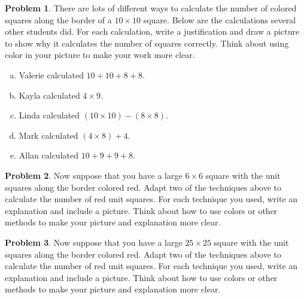 \documentclass[12pt, reqno]{amsart}
\theoremstyle{remark}
\theoremstyle{definition}
\newtheorem{problem}{Problem}
\numberwithin{equation}{section}  %
\begin{document}
\begin{problem}
There are lots of different ways to calculate the number of colored squares along the border of a $10\times 10$ square.  Below are the calculations several other students did.  For each calculation, write a justification and draw a picture to show why it calculates the number of squares correctly.  Think about using color in your picture to make your work more clear.

\begin{enumerate}[(a)]
\item
Valerie calculated $10 + 10 + 8 + 8$.\\

\item
Kayla calculated $4 \times 9$.\\


\item
Linda calculated $(10\times 10 ) - ( 8 \times 8 )$.\\

\item
Mark calculated $(4 \times 8) + 4$.\\

\item
Allan calculated $10+9+9+8$.
\end{enumerate}

\end{problem}


\bigskip



\begin{problem}
Now suppose that  you have a  large $6 \times 6$ square with the unit squares along the border  colored red.  Adapt two of the techniques above to calculate the number of red unit squares.
  For each technique you used, write an explanation and include a picture.  Think about how to use colors or other methods to make your picture and explanation more clear.
  \end{problem}
  
  \bigskip
  
  \begin{problem}
Now suppose that  you have a  large $25 \times 25$ square with the unit squares along the border  colored red.  Adapt two of the techniques above to calculate the number of red unit squares.
  For each technique you used, write an explanation and include a picture.  Think about how to use colors or other methods to make your picture and explanation more clear.
  \end{problem}
\end{document}
